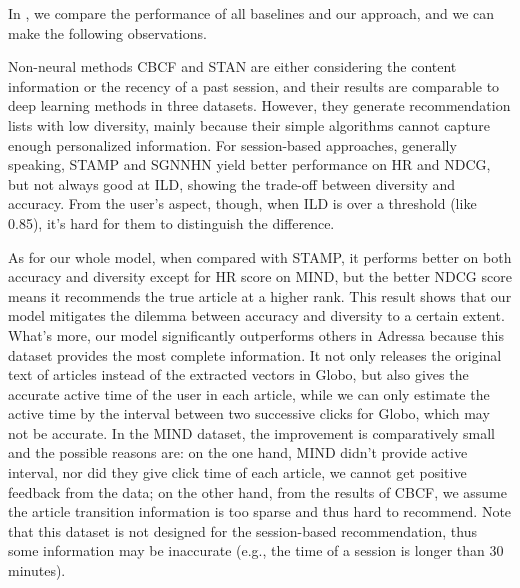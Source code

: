 In , we compare the performance of all baselines and our
approach, and we can make the following observations.

Non-neural methods CBCF and STAN are either considering the content information or the recency of a past session, and their results are comparable to deep learning methods in three datasets. However, they generate recommendation lists with low diversity, mainly because their simple algorithms cannot capture enough personalized information. For session-based approaches, generally speaking, STAMP and SGNNHN yield better performance on HR and NDCG, but not always good at ILD, showing the trade-off between diversity and accuracy. From the user's aspect, though, when ILD is over a threshold (like 0.85), it's hard for them to distinguish the difference. 

As for our whole model, when compared with STAMP, it performs better on both accuracy and diversity 
except for HR score on MIND, but the better NDCG score means it recommends the true article
at a higher rank. This result shows that our model mitigates the dilemma between accuracy and diversity 
to a certain extent. What's more, our model significantly outperforms others in Adressa 
because this dataset provides the most complete information. It not only releases the original 
text of articles instead of the extracted vectors in Globo, but also gives the accurate active time 
of the user in each article, while we can only estimate the active time by the interval between 
two successive clicks for Globo, which may not be accurate. In the MIND dataset, 
the improvement is comparatively small and the possible reasons are: 
on the one hand, MIND didn't provide active interval, nor did they give click time of each article, 
we cannot get positive feedback from the data; on the other hand, from the results of CBCF, 
we assume the article transition information is too sparse and thus hard to recommend. 
Note that this dataset is not designed for the session-based recommendation, thus some information 
may be inaccurate (e.g., the time of a session is longer than 30 minutes).

